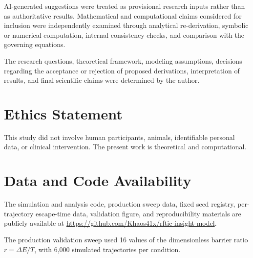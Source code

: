 AI-generated suggestions were treated as provisional research inputs rather than
as authoritative results. Mathematical and computational claims considered for
inclusion were independently examined through analytical re-derivation,
symbolic or numerical computation, internal consistency checks, and comparison
with the governing equations.

The research questions, theoretical framework, modeling assumptions, decisions
regarding the acceptance or rejection of proposed derivations, interpretation
of results, and final scientific claims were determined by the author.


\section*{Ethics Statement}
This study did not involve human participants, animals, identifiable personal
data, or clinical intervention. The present work is theoretical and
computational.

\section*{Data and Code Availability}
The simulation and analysis code, production sweep data, fixed seed registry,
per-trajectory escape-time data, validation figure, and reproducibility materials
are publicly available at
\url{https://github.com/Khaos41x/rftic-insight-model}.

The production validation sweep used 16 values of the dimensionless barrier
ratio $r=\Delta E/T$, with 6{,}000 simulated trajectories per condition.

